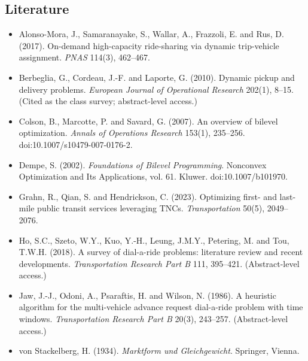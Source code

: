 \documentclass[11pt,letterpaper]{article}
\begin{document}
\subsection*{Literature}
\begin{itemize}[leftmargin=1.2em]
\item Alonso-Mora, J., Samaranayake, S., Wallar, A., Frazzoli, E. and Rus, D. (2017). On-demand high-capacity ride-sharing via dynamic trip-vehicle assignment. \emph{PNAS} 114(3), 462--467.
\item Berbeglia, G., Cordeau, J.-F. and Laporte, G. (2010). Dynamic pickup and delivery problems. \emph{European Journal of Operational Research} 202(1), 8--15. (Cited as the class survey; abstract-level access.)
\item Colson, B., Marcotte, P. and Savard, G. (2007). An overview of bilevel optimization. \emph{Annals of Operations Research} 153(1), 235--256. doi:10.1007/s10479-007-0176-2.
\item Dempe, S. (2002). \emph{Foundations of Bilevel Programming}. Nonconvex Optimization and Its Applications, vol. 61. Kluwer. doi:10.1007/b101970.
\item Grahn, R., Qian, S. and Hendrickson, C. (2023). Optimizing first- and last-mile public transit services leveraging TNCs. \emph{Transportation} 50(5), 2049--2076.
\item Ho, S.C., Szeto, W.Y., Kuo, Y.-H., Leung, J.M.Y., Petering, M. and Tou, T.W.H. (2018). A survey of dial-a-ride problems: literature review and recent developments. \emph{Transportation Research Part B} 111, 395--421. (Abstract-level access.)
\item Jaw, J.-J., Odoni, A., Psaraftis, H. and Wilson, N. (1986). A heuristic algorithm for the multi-vehicle advance request dial-a-ride problem with time windows. \emph{Transportation Research Part B} 20(3), 243--257. (Abstract-level access.)
\item von Stackelberg, H. (1934). \emph{Marktform und Gleichgewicht}. Springer, Vienna.
\end{itemize}
\end{document}
